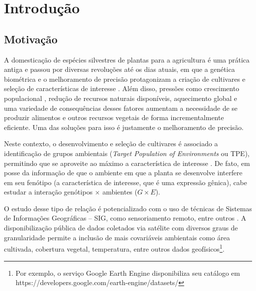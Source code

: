 \documentclass[12pt, a4paper, twoside]{report}
\numberwithin{equation}{subsection} %
\begin{document}
\newpage

\listoffigures

\newpage

\tableofcontents

\newpage

\setcounter{page}{8}

\chapter{Introdução}

\section{Motivação}

A domesticação de espécies silvestres de plantas para a agricultura é uma prática antiga e passou por diversas revoluções até os dias atuais, em que a genética biométrica e o melhoramento de precisão protagonizam a criação de cultivares e seleção de características de interesse \cite{melhora_precisa1}. Além disso, pressões como crescimento populacional \citep{hickey2019breeding}, redução de recursos naturais disponíveis, aquecimento global e uma variedade de consequências desses fatores \citep{jorasch2019} aumentam a necessidade de se produzir alimentos e outros recursos vegetais de forma incrementalmente eficiente. Uma das soluções para isso é justamente o melhoramento de precisão.

Neste contexto, o desenvolvimento e seleção de cultivares é associado a identificação de grupos ambientais (\textit{Target Population of Environments} ou TPE), permitindo que se aproveite ao máximo a característica de interesse \cite{chenu2015characterizing}. De fato, em posse da informação de que o ambiente em que a planta se desenvolve interfere em seu fenótipo (a característica de interesse, que é uma expressão gênica), cabe estudar a interação genótipos $\times$ ambientes ($G \times E$).

O estudo desse tipo de relação é potencializado com o uso de técnicas de Sistemas de Informações Geográficas -- SIG, como sensoriamento remoto, entre outros \cite{melhora_precisa1}. A disponibilização pública de dados coletados via satélite com diversos graus de granularidade permite a inclusão de mais covariáveis ambientais como área cultivada, cobertura vegetal, temperatura, entre outros dados geofísicos\footnote{Por exemplo, o serviço Google Earth Engine disponibiliza seu catálogo em https://developers.google.com/earth-engine/datasets/}.
\end{document}
